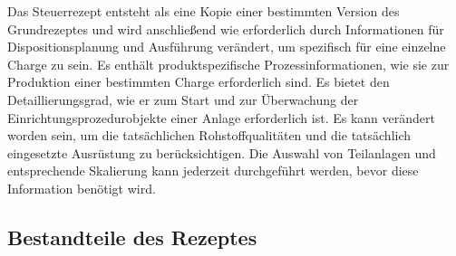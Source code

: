 Das Steuerrezept entsteht als eine Kopie einer bestimmten Version des Grundrezeptes und wird anschließend wie erforderlich durch Informationen für Dispositionsplanung und Ausführung verändert, um spezifisch für eine einzelne Charge zu sein. Es enthält produktspezifische Prozessinformationen, wie sie zur Produktion einer bestimmten Charge erforderlich sind. Es bietet den Detaillierungsgrad, wie er zum Start und zur Überwachung der Einrichtungsprozedurobjekte einer Anlage erforderlich ist. Es kann verändert worden sein, um die tatsächlichen Rohstoffqualitäten und die tatsächlich eingesetzte Ausrüstung zu berücksichtigen. Die Auswahl von Teilanlagen und entsprechende Skalierung kann jederzeit durchgeführt werden, bevor diese Information benötigt wird. \cite{batchproc}
\newpage
\subsection{Bestandteile des Rezeptes}

